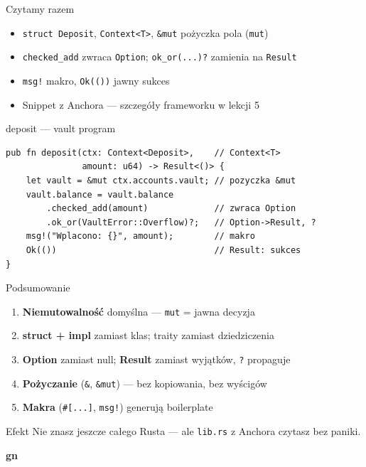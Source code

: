 \begin{frame}[fragile]{Czytamy razem}
  \begin{itemize}
    \item \texttt{struct Deposit}, \texttt{Context<T>}, \texttt{\&mut} pożyczka pola (\texttt{mut})
    \item \texttt{checked\_add} zwraca \texttt{Option}; \texttt{ok\_or(...)?} zamienia na \texttt{Result}
    \item \texttt{msg!} makro, \texttt{Ok(())} jawny sukces
    \item \textcolor{stplmuted}{Snippet z Anchora --- szczegóły frameworku w lekcji 5}
  \end{itemize}
  \begin{block}{deposit --- vault program}
\begin{lstlisting}
pub fn deposit(ctx: Context<Deposit>,    // Context<T>
               amount: u64) -> Result<()> {
    let vault = &mut ctx.accounts.vault; // pozyczka &mut
    vault.balance = vault.balance
        .checked_add(amount)             // zwraca Option
        .ok_or(VaultError::Overflow)?;   // Option->Result, ?
    msg!("Wplacono: {}", amount);        // makro
    Ok(())                               // Result: sukces
}
\end{lstlisting}
  \end{block}
\end{frame}

\begin{frame}{Podsumowanie}
  \begin{enumerate}
    \item \textbf{Niemutowalność} domyślna --- \texttt{mut} = jawna decyzja
    \item \textbf{struct + impl} zamiast klas; traity zamiast dziedziczenia
    \item \textbf{Option} zamiast null; \textbf{Result} zamiast wyjątków, \texttt{?} propaguje
    \item \textbf{Pożyczanie} (\texttt{\&}, \texttt{\&mut}) --- bez kopiowania, bez wyścigów
    \item \textbf{Makra} (\texttt{\#[...]}, \texttt{msg!}) generują boilerplate
  \end{enumerate}
  \vspace{0.2cm}
  \begin{exampleblock}{Efekt}
    Nie znasz jeszcze całego Rusta --- ale \texttt{lib.rs} z Anchora czytasz bez paniki.
  \end{exampleblock}
\end{frame}

\begin{frame}[plain]
  \begin{center}
    \vfill
    {\Huge\bfseries\color{stplwhite} gn}
    \vfill
  \end{center}
\end{frame}


